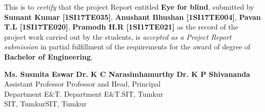 \certificate


\noindent This is to \textit{certify} that the project Report entitled \textbf{Eye for blind}, submitted by \textbf{Sumant Kumar [1SI17TE035]}, \textbf{Anushant Bhushan [1SI17TE004]}, \textbf{Pavan T.L [1SI17TE020]}, \textbf{Pramodh H.R [1SI17TE021]} as the record of the project work carried out by the students, is \textit{accepted as a Project Report submission} in partial fulfillment of the requirements for the award of degree of \textbf{Bachelor of Engineering}.

\vspace*{2cm}

\begin{singlespacing}
 \noindent \textbf{Ms. Susmita Eswar} \hspace{1.5cm} \textbf{Dr. K C Narasimhamurthy}\hspace{1cm} \textbf{Dr. K P Shivananda}\\
Assistant Professor\hspace{1.8cm} Professor and Head,\hspace{2.5cm} Principal \\
Department  E$\&$T. \hspace{2.05cm}Department  E$\&$T.\hspace{3cm}SIT, Tumkur\\
SIT, Tumkur\hspace{3.05cm}SIT, Tumkur \\


\end{singlespacing}
